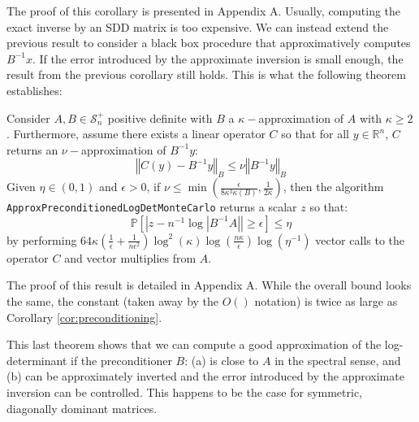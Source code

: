 The proof of this corollary is presented in Appendix A. Usually, computing
the exact inverse by an SDD matrix is too expensive. We can instead
extend the previous result to consider a black box procedure that
approximatively computes $B^{-1}x$. If the error introduced by the
approximate inversion is small enough, the result from the previous
corollary still holds. This is what the following theorem establishes:

\begin{theorem}\label{thm:preconditioning-approx}Consider $A,B\in\mathcal{S}_{n}^{+}$
positive definite with $B$ a $\kappa-$approximation of $A$ with
$\kappa\geq2$. Furthermore, assume there exists a linear operator
$C$ so that for all $y\in\mathbb{R}^{n}$, $C$ returns an $\nu-$approximation
of $B^{-1}y$:
\[
\left\Vert C\left(y\right)-B^{-1}y\right\Vert _{B}\leq\nu\left\Vert B^{-1}y\right\Vert _{B}
\]
Given $\eta\in\left(0,1\right)$ and $\epsilon>0$, if $\nu\leq\min\left(\frac{\epsilon}{8\kappa^{3}\kappa\left(B\right)},\frac{1}{2\kappa}\right)$,
then the algorithm \texttt{ApproxPreconditionedLogDetMonteCarlo} returns
a scalar $z$ so that:
\[
\mathbb{P}\left[\left|z-n^{-1}\log\left|B^{-1}A\right|\right|\geq\epsilon\right]\leq\eta
\]
by performing $64\kappa\left(\frac{1}{\epsilon}+\frac{1}{n\epsilon^{2}}\right)\log^{2}\left(\kappa\right)\log\left(\frac{n\kappa}{\epsilon}\right)\log\left(\eta^{-1}\right)$
vector calls to the operator $C$ and vector multiplies from $A$. 

\end{theorem}

The proof of this result is detailed in Appendix A. While the overall
bound looks the same, the constant (taken away by the $O\left(\right)$
notation) is twice as large as Corollary \ref{cor:preconditioning}.

This last theorem shows that we can compute a good approximation of
the log-determinant if the preconditioner $B$: (a) is close to $A$
in the spectral sense, and (b) can be approximately inverted and the
error introduced by the approximate inversion can be controlled. This
happens to be the case for symmetric, diagonally dominant matrices.

